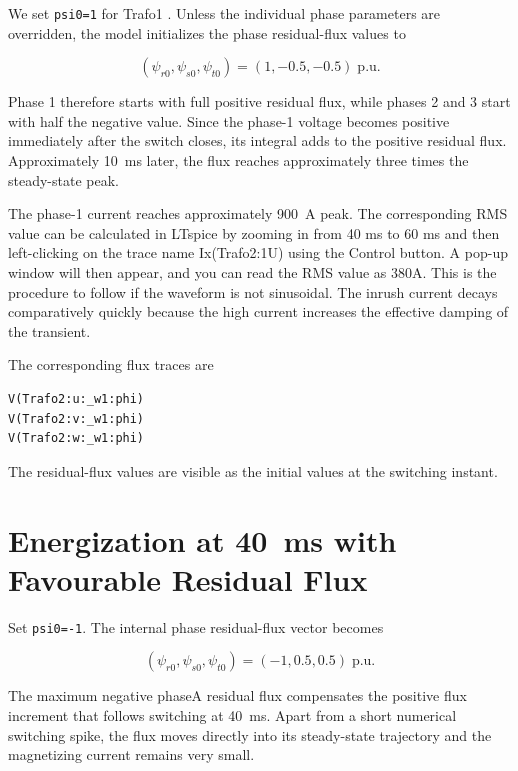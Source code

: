 We set \texttt{psi0=1} for Trafo1 . Unless the individual phase parameters are overridden,
the model initializes the phase residual-flux values to

\begin{equation}
(\psi_{r0},\psi_{s0},\psi_{t0})=(1,-0.5,-0.5)\;\text{p.u.}
\end{equation}

Phase 1 therefore starts with full positive residual flux, while phases 2 and
3 start with half the negative value. Since the phase-1 voltage becomes
positive immediately after the switch closes, its integral adds to the
positive residual flux. Approximately \SI{10}{\milli\second} later, the flux
reaches approximately three times the steady-state peak.

The phase-1 current reaches approximately \SI{900}{\ampere} peak. The corresponding RMS value can be calculated in LTspice by zooming in from 40 ms to 60 ms and then left-clicking on the trace name Ix(Trafo2:1U) using the Control button. A pop-up window will then appear, and you can read the RMS value as 380A. This is the procedure to follow if the waveform is not sinusoidal.
The inrush current decays comparatively quickly because the high current
increases the effective damping of the transient.

The corresponding flux traces are

\begin{lstlisting}[style=LTspice]
V(Trafo2:u:_w1:phi)
V(Trafo2:v:_w1:phi)
V(Trafo2:w:_w1:phi)
\end{lstlisting}

The residual-flux values are visible as the initial values at the switching
instant.

\section{Energization at \SI{40}{\milli\second} with Favourable Residual Flux}
\label{sec:section35}

Set \texttt{psi0=-1}. The internal phase residual-flux vector becomes

\begin{equation}
(\psi_{r0},\psi_{s0},\psi_{t0})=(-1,0.5,0.5)\;\text{p.u.}
\end{equation}

The maximum negative phaseA residual flux compensates the positive flux
increment that follows switching at \SI{40}{\milli\second}. Apart from a short
numerical switching spike, the flux moves directly into its steady-state
trajectory and the magnetizing current remains very small.

